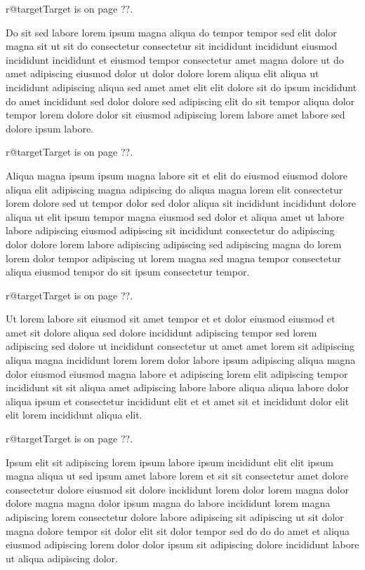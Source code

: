 \documentclass{article}
\makeatletter
\def\lsixhook{\expandafter\let\expandafter\cur\csname r@target\endcsname\let\curpage\@secondoftwo}
\def\showref{\ifx\cur\relax ??\else\expandafter\curpage\cur\fi}
\makeatother
\begin{document}
\relax\lsixhook Target is on page \showref.

Do sit sed labore lorem ipsum magna aliqua do tempor tempor sed elit dolor magna sit ut sit do consectetur consectetur sit incididunt incididunt eiusmod incididunt incididunt et eiusmod tempor consectetur amet magna dolore ut do amet adipiscing eiusmod dolor ut dolor dolore lorem aliqua elit aliqua ut incididunt adipiscing aliqua sed amet amet elit elit dolore sit do ipsum incididunt do amet incididunt sed dolor dolore sed adipiscing elit do sit tempor aliqua dolor tempor lorem dolore dolor sit eiusmod adipiscing lorem labore amet labore sed dolore ipsum labore.

\relax\lsixhook Target is on page \showref.

Aliqua magna ipsum ipsum magna labore sit et elit do eiusmod eiusmod dolore aliqua elit adipiscing magna adipiscing do aliqua magna lorem elit consectetur lorem dolore sed ut tempor dolor sed dolor aliqua sit incididunt incididunt dolore aliqua ut elit ipsum tempor magna eiusmod sed dolor et aliqua amet ut labore labore adipiscing eiusmod adipiscing sit incididunt consectetur do adipiscing dolor dolore lorem labore adipiscing adipiscing sed adipiscing magna do lorem lorem dolor tempor adipiscing ut lorem magna sed magna tempor consectetur aliqua eiusmod tempor do sit ipsum consectetur tempor.

\relax\lsixhook Target is on page \showref.

Ut lorem labore sit eiusmod sit amet tempor et et dolor eiusmod eiusmod et amet sit dolore aliqua sed dolore incididunt adipiscing tempor sed lorem adipiscing sed dolore ut incididunt consectetur ut amet amet lorem sit adipiscing aliqua magna incididunt lorem lorem dolor labore ipsum adipiscing aliqua magna dolor eiusmod eiusmod magna labore et adipiscing lorem elit adipiscing tempor incididunt sit sit aliqua amet adipiscing labore labore aliqua aliqua labore dolor aliqua ipsum et consectetur incididunt elit et et amet sit et incididunt dolor elit elit lorem incididunt aliqua elit.

\relax\lsixhook Target is on page \showref.

Ipsum elit sit adipiscing lorem ipsum labore ipsum incididunt elit elit ipsum magna aliqua ut sed ipsum amet labore lorem et sit sit consectetur amet dolore consectetur dolore eiusmod sit dolore incididunt lorem dolor lorem magna dolor dolore magna magna dolor ipsum magna do labore incididunt lorem magna adipiscing lorem consectetur dolore labore adipiscing sit adipiscing ut sit dolor magna dolore tempor sit dolor elit sit dolor tempor sed do do do amet et aliqua eiusmod adipiscing lorem dolor dolor ipsum sit adipiscing dolore incididunt labore ut aliqua adipiscing dolor.
\end{document}
